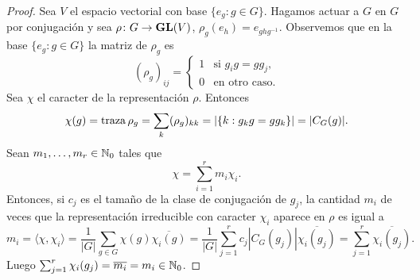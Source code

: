 \begin{proof}
  Sea $V$ el espacio vectorial con base $\{e_g:g\in G\}$.  Hagamos actuar a $G$
  en $G$ por conjugación y sea $\rho\colon G\to\mathbf{GL}(V)$,
  $\rho_g(e_h)=e_{ghg^{-1}}$.  Observemos que en la base $\{e_g:g\in G\}$ la
  matriz de $\rho_g$ es
  \[
   (\rho_g)_{ij}=\begin{cases} 
    1 & \text{si $g_ig=gg_j$},\\
    0 & \text{en otro caso}.
  \end{cases}
  \]
  Sea $\chi$ el caracter de la
  representación $\rho$. Entonces 
  \[
    \chi(g)=\operatorname{traza}\rho_g=\sum_{k}(\rho_g)_{kk}=|\{k:g_kg=gg_k\}|=|C_G(g)|.
  \]
  Sean $m_1,\dots,m_r\in\mathbb{N}_0$ tales que 
  \[
	\chi=\sum_{i=1}^rm_i\chi_i.
  \]
  Entonces, si $c_j$ es el tamaño de la clase de conjugación de $g_j$, la
  cantidad $m_i$ de veces que la representación irreducible con caracter
  $\chi_i$ aparece en $\rho$ es igual a 
  \[
	  m_i=\langle\chi,\chi_i\rangle=\frac{1}{|G|}\sum_{g\in G}\chi(g)\overline{\chi_i(g)}
	  =\frac{1}{|G|}\sum_{j=1}^rc_j|C_G(g_j)|\overline{\chi_i(g_j)}
	  =\sum_{j=1}^r\overline{\chi_i(g_j)}.
  \]
  Luego $\sum_{j=1}^r\chi_i(g_j)=\overline{m_i}=m_i\in\mathbb{N}_0$.
\end{proof}

